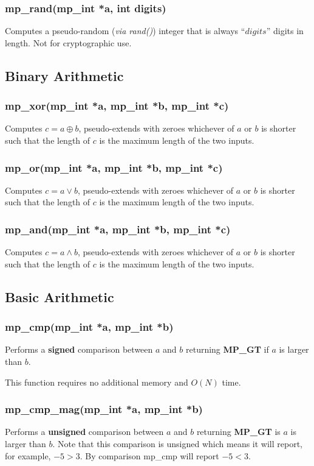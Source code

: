 \documentclass[]{article}
\begin{document}
\subsubsection{mp\_rand(mp\_int *a, int digits)}
Computes a pseudo-random (\textit{via rand()}) integer that is always ``$digits$'' digits in length.  Not for
cryptographic use.

\subsection{Binary Arithmetic}
\subsubsection{mp\_xor(mp\_int *a, mp\_int *b, mp\_int *c)}
Computes $c = a \oplus b$, pseudo-extends with zeroes whichever of $a$ or $b$ is shorter such that the length
of $c$ is the maximum length of the two inputs.

\subsubsection{mp\_or(mp\_int *a, mp\_int *b, mp\_int *c)}
Computes $c = a \lor b$, pseudo-extends with zeroes whichever of $a$ or $b$ is shorter such that the length
of $c$ is the maximum length of the two inputs.

\subsubsection{mp\_and(mp\_int *a, mp\_int *b, mp\_int *c)}
Computes $c = a \land b$, pseudo-extends with zeroes whichever of $a$ or $b$ is shorter such that the length
of $c$ is the maximum length of the two inputs.

\subsection{Basic Arithmetic}

\subsubsection{mp\_cmp(mp\_int *a, mp\_int *b)}
Performs a \textbf{signed} comparison between $a$ and $b$ returning \textbf{MP\_GT} if $a$ is larger than $b$.

This function requires no additional memory and $O(N)$ time.

\subsubsection{mp\_cmp\_mag(mp\_int *a, mp\_int *b)}
Performs a \textbf{unsigned} comparison between $a$ and $b$ returning \textbf{MP\_GT} is $a$ is larger than $b$.  Note 
that this comparison is unsigned which means it will report, for example, $-5 > 3$.  By comparison mp\_cmp will 
report $-5 < 3$.
\end{document}
